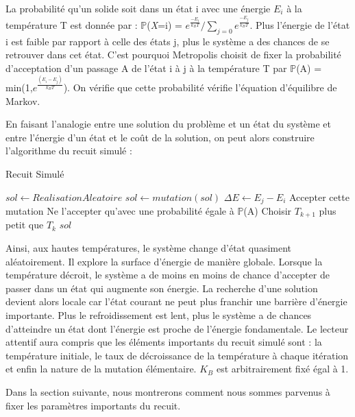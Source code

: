 \documentclass{article}%
\begin{document}
	La probabilité qu'un solide soit dans un état i avec une énergie $E_i$ à la température T est donnée par : $\mathbb{P}$(\emph{X}=i) = $e^{\frac{-E_i}{k_BT}} / \sum_{j=0} e^{\frac{-E_j}{k_BT}}$. Plus l'énergie de l'état i est faible par rapport à celle des états j, plus le système a des chances de se retrouver dans cet état. C'est pourquoi Metropolis choisit de fixer la probabilité d'acceptation d'un passage A de l'état i à j à la température T par $\mathbb{P}$(A) = min(1,$e^\frac{(E_i-E_j)}{k_BT}$). On vérifie que cette probabilité vérifie l'équation d'équilibre de Markov. 
	
	\vspace{1cm}
	
	En faisant l'analogie entre une solution du problème et un état du système et entre l'énergie d'un état et le coût de la solution, on peut alors construire l'algorithme du recuit simulé :
	
	\begin{algorithm} 
	\caption{Recuit Simulé}
	\begin{algorithmic}
	
	\STATE $sol \leftarrow RealisationAleatoire$
		\STATE $sol \leftarrow mutation( sol ) $
		\STATE $\Delta{E} \leftarrow E_j-E_i$
			\STATE Accepter cette mutation	
		\ELSE 
			\STATE Ne l'accepter qu'avec une probabilité égale à $\mathbb{P}$(A)
		\ENDIF
		\STATE Choisir $T_{k+1}$ plus petit que $T_{k}$
	\ENDFOR
	\RETURN $sol$
	\end{algorithmic}
	\end{algorithm}
\vspace{1cm}

Ainsi, aux hautes températures, le système change d'état quasiment aléatoirement. Il explore la surface d'énergie de manière globale. Lorsque la température décroit, le système a de moins en moins de chance d'accepter de passer dans un état qui augmente son énergie. La recherche d'une solution devient alors locale car l'état courant ne peut plus franchir une barrière d'énergie importante. Plus le refroidissement est lent, plus le système a de chances d'atteindre un état dont l'énergie est proche de l'énergie fondamentale. Le lecteur attentif aura compris que les éléments importants du recuit simulé sont : la température initiale, le taux de décroissance de la température à chaque itération et enfin la nature de la mutation élémentaire. $K_B$ est arbitrairement fixé égal à 1.

Dans la section suivante, nous montrerons comment nous sommes parvenus à fixer les paramètres importants du recuit.
\end{document}
